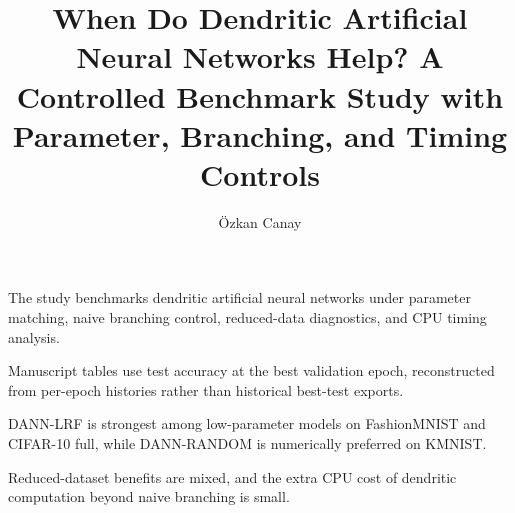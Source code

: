 \documentclass[preprint,12pt]{elsarticle}
\newcommand{\DANNLRF}{\textsc{DANN-LRF}}
\newcommand{\DANNRANDOM}{\textsc{DANN-RANDOM}}
\begin{document}
\begin{frontmatter}

\title{When Do Dendritic Artificial Neural Networks Help? A Controlled Benchmark Study with Parameter, Branching, and Timing Controls}

\author[inst1]{{\"O}zkan Canay}


\begin{highlights}
\item The study benchmarks dendritic artificial neural networks under parameter matching, naive branching control, reduced-data diagnostics, and CPU timing analysis.
\item Manuscript tables use test accuracy at the best validation epoch, reconstructed from per-epoch histories rather than historical best-test exports.
\item \DANNLRF{} is strongest among low-parameter models on FashionMNIST and CIFAR-10 full, while \DANNRANDOM{} is numerically preferred on KMNIST.
\item Reduced-dataset benefits are mixed, and the extra CPU cost of dendritic computation beyond naive branching is small.
\end{highlights}


\end{frontmatter}
\end{document}

